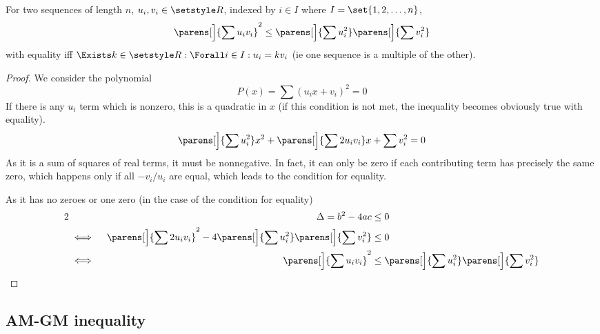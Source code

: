 \begin{theorem}
For two sequences of length \(n\), \(u_i, v_i \in \Reals\), indexed by
\(i \in I\) where \(I = \set{1, 2, \dotsc, n}\),
\begin{equation*}
    \parens[\Big]{\sum u_i v_i}^2 \le
        \parens[\Big]{\sum u_i^2} \parens[\Big]{\sum v_i^2}
\end{equation*}
with equality iff \(\Exists k \in \Reals: \Forall i \in I: u_i = k v_i\) (ie one
sequence is a multiple of the other).
\end{theorem}
\begin{proof}
We consider the polynomial
\begin{equation*}
P(x) = \sum (u_i x + v_i)^2 = 0
\end{equation*}
If there is any \(u_i\) term which is nonzero, this is a quadratic in \(x\)
(if this condition is not met, the inequality becomes obviously true with
equality).
\begin{equation*}
    \parens[\Big]{\sum u_i^2} x^2
  + \parens[\Big]{\sum 2 u_i v_i} x + \sum v_i^2 = 0
\end{equation*}
As it is a sum of squares of real terms, it must be nonnegative. In fact, it
can only be zero if each contributing term has precisely the same zero,
which happens only if all \(-v_i/u_i\) are equal, which leads to the
condition for equality.

As it has no zeroes or one zero (in the case of the condition for equality)
\begin{alignat*}2
    &&\Delta = b^2 - 4ac &\le 0 \\
    &\iff{}&
    \parens[\Big]{\sum 2 u_i v_i}^2 -
                  4\parens[\Big]{\sum u_i^2}\parens[\Big]{\sum v_i^2} &\le 0 \\
    &\iff{}& \parens[\Big]{\sum u_i v_i}^2
        &\le \parens[\Big]{\sum u_i^2} \parens[\Big]{\sum v_i^2} \qedhere
\end{alignat*}
\end{proof}

\subsection{AM-GM inequality}

